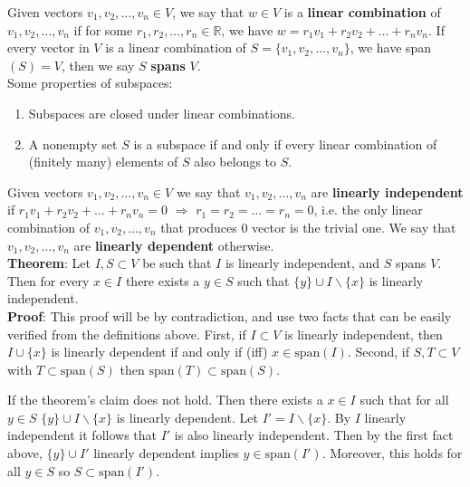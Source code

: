 \documentclass[12pt,oneside]{article}
\begin{document}
Given vectors $v_{1}, v_{2}, \ldots, v_{n} \in V$, we say that $w \in
V$ is a \textbf{linear combination} of $v_{1}, v_{2}, \ldots, v_{n}$
if for some $r_{1}, r_{2}, \ldots, r_{n} \in \mathbb{R}$, we have $w =
r_{1} v_{1} + r_{2} v_{2} + \ldots + r_{n} v_{n}$. If every vector in
$V$ is a linear combination of $S=\{v_{1}, v_{2}, \ldots, v_{n}\}$,
we have span\((S)=V\), then we say \(S\) \textbf{spans} $V$.\\


\noindent Some properties of subspaces:
\begin{enumerate}
\item Subspaces are closed under linear combinations.
\item A nonempty set $S$ is a subspace if and only if every linear
combination of (finitely many) elements of $S$ also belongs to $S$. \\
  \end{enumerate}

Given vectors $v_{1}, v_{2}, \ldots, v_{n} \in V$ we say that $v_{1},
v_{2}, \ldots, v_{n}$ are \textbf{linearly independent} if $r_{1}
v_{1} + r_{2} v_{2} + \ldots + r_{n} v_{n} = 0$ $\Longrightarrow$
$r_{1} = r_{2} = \ldots = r_{n} = 0$, i.e. the only linear combination
of $v_{1}, v_{2}, \ldots, v_{n}$ that produces $0$ vector is the
trivial one. We say that $v_{1}, v_{2}, \ldots, v_{n}$ are
\textbf{linearly dependent} otherwise.\\

\textbf{Theorem}: Let \(I,S \subset V\) be such that \( I \) is linearly independent, and \( S \) spans \(V\). Then for every \(x\in I \) there exists a \(y \in S \) such that \( \{y\} \cup I \backslash \{x\}\) is linearly independent. \\

\textbf{Proof}: This proof will be by contradiction, and use two facts that can be easily verified from the definitions above. First, if \(I \subset V\) is linearly independent, then \( I \cup \{x\} \) is linearly dependent if and only if (iff) \(x \in \text{span}(I) \). Second, if  \(S,T \subset V\) with \(T \subset \text{span}(S) \) then \(\text{span}(T) \subset \text{span}(S) \).

If the theorem's claim does not hold. Then there exists a \( x \in I \) such that for all \( y \in S \) \( \{y\} \cup I \backslash \{x\}\) is linearly dependent. Let \( I'=I \backslash \{x\} \). By \(I \) linearly independent it follows that \( I' \) is also linearly independent. Then by the first fact above, \(\{y\} \cup I' \) linearly dependent implies \( y \in \text{span}(I') \). Moreover, this holds for all \( y \in S \) so \( S \subset \text{span}(I') \).
\end{document}
